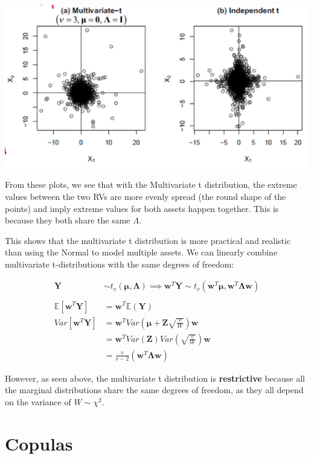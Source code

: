 \documentclass[
  oneside]{book}
\begin{document}
\includegraphics{Notes/Obsidian-Attachments/4-Multivariate-Return-Modelling.png}

From these plots, we see that with the Multivariate t distribution, the extreme values between the two RVs are more evenly spread (the round shape of the points) and imply extreme values for both assets happen together. This is because they both share the same \(\Lambda\).

This shows that the multivariate t distribution is more practical and realistic than using the Normal to model multiple assets. We can linearly combine multivariate t-distributions with the same degrees of freedom:

\[
\begin{aligned}
\mathbf{Y} &\sim t_{v}(\boldsymbol{\mu}, \boldsymbol{\Lambda}) \implies \mathbf{w}^{T}\mathbf{Y} \sim t_{v}(\mathbf{w}^{T}\boldsymbol{\mu}, \mathbf{w}^{T}\boldsymbol{\Lambda}\mathbf{w})\\
\\
\mathbb{E}[\mathbf{w}^{T}\mathbf{Y}] &= \mathbf{w}^{T}\mathbb{E}(\mathbf{Y})\\
Var[\mathbf{w}^{T}\mathbf{Y}] &= \mathbf{w}^{T}Var\left( \boldsymbol{\mu}+\mathbf{Z}\sqrt{ \frac{v}{W} } \right)\mathbf{w}\\
&= \mathbf{w}^{T}Var(\mathbf{Z})Var\left( \sqrt{ \frac{v}{W} } \right)\mathbf{w}\\
&= \frac{v}{v-2}(\mathbf{w}^{T}\boldsymbol{\Lambda}\mathbf{w})
\end{aligned}
\]

However, as seen above, the multivariate t distribution is \textbf{restrictive} because all the marginal distributions share the same degrees of freedom, as they all depend on the variance of \(W \sim\chi^{2}\).

\hypertarget{copulas}{%
\chapter{Copulas}\label{copulas}}
\end{document}

